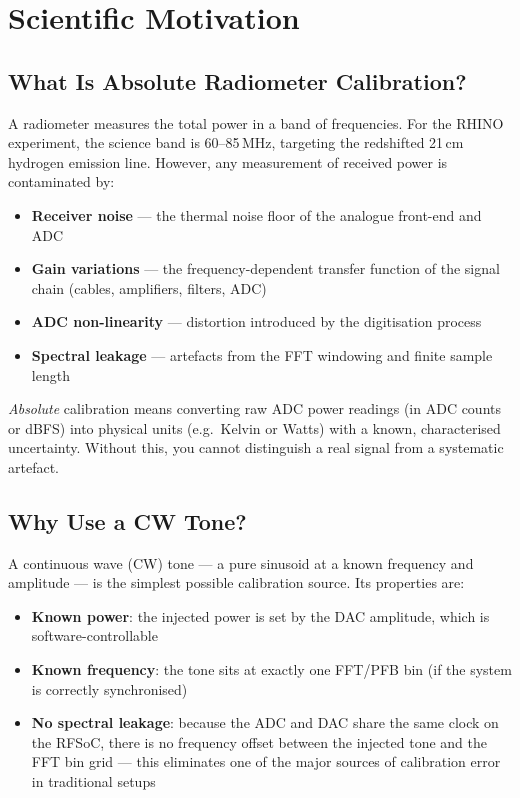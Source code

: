 \documentclass[11pt,a4paper]{article}
\begin{document}
\section{Scientific Motivation}

\subsection{What Is Absolute Radiometer Calibration?}

A radiometer measures the total power in a band of frequencies. For the RHINO
experiment, the science band is 60--85\,MHz, targeting the redshifted 21\,cm
hydrogen emission line. However, any measurement of received power is contaminated
by:

\begin{itemize}[leftmargin=2em,itemsep=3pt]
  \item \textbf{Receiver noise} --- the thermal noise floor of the analogue front-end
        and ADC
  \item \textbf{Gain variations} --- the frequency-dependent transfer function of the
        signal chain (cables, amplifiers, filters, ADC)
  \item \textbf{ADC non-linearity} --- distortion introduced by the digitisation process
  \item \textbf{Spectral leakage} --- artefacts from the FFT windowing and finite
        sample length
\end{itemize}

\textit{Absolute} calibration means converting raw ADC power readings (in ADC counts
or dBFS) into physical units (e.g.\ Kelvin or Watts) with a known, characterised
uncertainty. Without this, you cannot distinguish a real signal from a systematic
artefact.

\subsection{Why Use a CW Tone?}

A continuous wave (CW) tone --- a pure sinusoid at a known frequency and amplitude
--- is the simplest possible calibration source. Its properties are:

\begin{itemize}[leftmargin=2em,itemsep=3pt]
  \item \textbf{Known power}: the injected power is set by the DAC amplitude, which is
        software-controllable
  \item \textbf{Known frequency}: the tone sits at exactly one FFT/PFB bin (if the
        system is correctly synchronised)
  \item \textbf{No spectral leakage}: because the ADC and DAC share the same clock on
        the RFSoC, there is no frequency offset between the injected tone and the FFT
        bin grid --- this eliminates one of the major sources of calibration error in
        traditional setups
\end{itemize}
\end{document}
